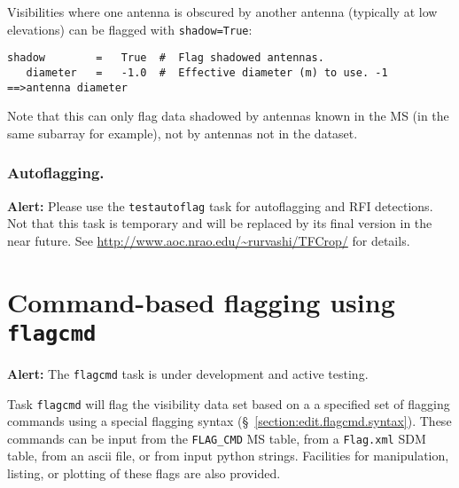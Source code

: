 Visibilities where one antenna is obscured by another antenna
(typically at low elevations) can be flagged with {\tt shadow=True}:
\small
\begin{verbatim}
shadow        =   True  #  Flag shadowed antennas.
   diameter   =   -1.0  #  Effective diameter (m) to use. -1 ==>antenna diameter
\end{verbatim}
\normalsize
Note that this can only flag data shadowed by antennas known in the MS
(in the same subarray for example), not by antennas not in the dataset.

\subsubsection{Autoflagging.}  

{\bf Alert:} Please use the {\tt testautoflag} task for autoflagging
and RFI detections. Not that this task is temporary and will be
replaced by its final version in the near future. See
\url{http://www.aoc.nrao.edu/~rurvashi/TFCrop/} for details.

\section{Command-based flagging using {\tt flagcmd}}
\label{section:edit.flagcmd}

{\bf Alert:} The {\tt flagcmd} task is under development and
active testing.  

Task {\tt flagcmd} will flag the visibility data set based on a
a specified set of flagging commands using a special flagging 
syntax (\S~\ref{section:edit.flagcmd.syntax}).  These commands
can be input from the {\tt FLAG\_CMD} MS table, from a 
{\tt Flag.xml} SDM table, from an ascii
file, or from input python strings.  Facilities for manipulation,
listing, or plotting of these flags are also provided.

